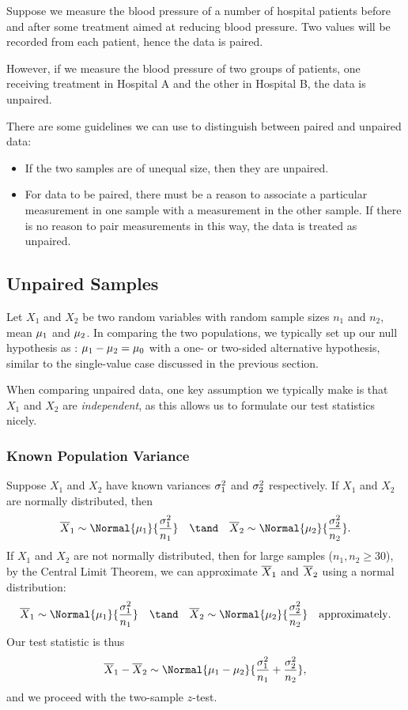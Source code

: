 \begin{example}
    Suppose we measure the blood pressure of a number of hospital patients before and after some treatment aimed at reducing blood pressure. Two values will be recorded from each patient, hence the data is paired.

    However, if we measure the blood pressure of two groups of patients, one receiving treatment in Hospital A and the other in Hospital B, the data is unpaired.
\end{example}

There are some guidelines we can use to distinguish between paired and unpaired data:
\begin{itemize}
    \item If the two samples are of unequal size, then they are unpaired.
    \item For data to be paired, there must be a reason to associate a particular measurement in one sample with a measurement in the other sample. If there is no reason to pair measurements in this way, the data is treated as unpaired.
\end{itemize}

\subsection{Unpaired Samples}

Let $X_1$ and $X_2$ be two random variables with random sample sizes $n_1$ and $n_2$, mean $\mu_1$ and $\mu_2$. In comparing the two populations, we typically set up our null hypothesis as \nullhyp: $\mu_1 - \mu_2 = \mu_0$ with a one- or two-sided alternative hypothesis, similar to the single-value case discussed in the previous section.

When comparing unpaired data, one key assumption we typically make is that $X_1$ and $X_2$ are \emph{independent}, as this allows us to formulate our test statistics nicely. 

\subsubsection{Known Population Variance}

Suppose $X_1$ and $X_2$ have known variances $\sigma_1^2$ and $\sigma_2^2$ respectively. If $X_1$ and $X_2$ are normally distributed, then \[\ol{X}_1 \sim \Normal{\m_1}{\frac{\s_1^2}{n_1}} \quad \tand \quad \ol{X}_2 \sim \Normal{\m_2}{\frac{\s_2^2}{n_2}}.\] If $X_1$ and $X_2$ are not normally distributed, then for large samples ($n_1, n_2 \geq 30$), by the Central Limit Theorem, we can approximate $\overline{X}_1$ and $\overline{X}_2$ using a normal distribution: \[\ol{X}_1 \sim \Normal{\m_1}{\frac{\s_1^2}{n_1}} \quad \tand \quad \ol{X}_2 \sim \Normal{\m_2}{\frac{\s_2^2}{n_2}} \quad \text{approximately}.\] Our test statistic is thus \[\ol{X}_1 - \ol{X}_2 \sim \Normal{\m_1 - \m_2}{\frac{\s_1^2}{n_1} + \frac{\s_2^2}{n_2}},\] and we proceed with the two-sample $z$-test.

